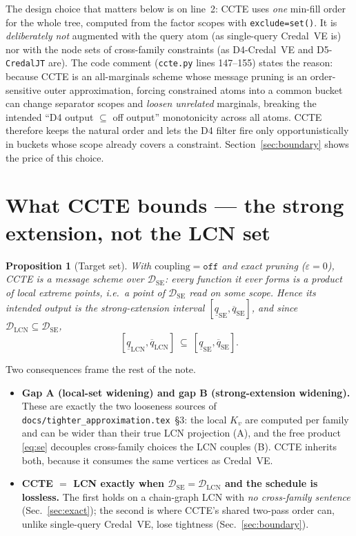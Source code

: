 \documentclass[11pt]{article}
\newtheorem{proposition}{Proposition}
\newcommand{\lo}{\underline}
\newcommand{\hi}{\overline}
\newcommand{\DSE}{\mathcal{D}_{\mathrm{SE}}}
\newcommand{\DLCN}{\mathcal{D}_{\mathrm{LCN}}}
\begin{document}
The design choice that matters below is on line~2: CCTE uses \emph{one} min-fill order for the
whole tree, computed from the factor scopes with \texttt{exclude=set()}. It is
\emph{deliberately not} augmented with the query atom (as single-query Credal~VE is) nor with
the node sets of cross-family constraints (as D4-Credal~VE and D5-\texttt{CredalJT} are). The
code comment (\texttt{ccte.py} lines 147--155) states the reason: because CCTE is an
all-marginals scheme whose message pruning is an order-sensitive outer approximation, forcing
constrained atoms into a common bucket can change separator scopes and \emph{loosen unrelated}
marginals, breaking the intended ``D4 output $\subseteq$ off output'' monotonicity across all
atoms. CCTE therefore keeps the natural order and lets the D4 filter fire only opportunistically
in buckets whose scope already covers a constraint. Section~\ref{sec:boundary} shows the price
of this choice.

\section{What CCTE bounds --- the strong extension, not the LCN set}\label{sec:whatbounds}

\begin{proposition}[Target set]\label{prop:target}
With $\mathrm{coupling}=\texttt{off}$ and exact pruning ($\varepsilon{=}0$), CCTE is a message
scheme over $\DSE$: every function it ever forms is a product of local extreme points, i.e.\ a
point of $\DSE$ read on some scope. Hence its \emph{intended} output is the strong-extension
interval $[\lo q_{\mathrm{SE}},\hi q_{\mathrm{SE}}]$, and since $\DLCN\subseteq\DSE$,
\[
  [\lo q_{\mathrm{LCN}},\hi q_{\mathrm{LCN}}]\ \subseteq\
  [\lo q_{\mathrm{SE}},\hi q_{\mathrm{SE}}].
\]
\end{proposition}

Two consequences frame the rest of the note.
\begin{itemize}
  \item \textbf{Gap A (local-set widening) and gap B (strong-extension widening).} These are
    exactly the two looseness sources of \texttt{docs/tighter\_approximation.tex}~\S3: the local
    $K_v$ are computed per family and can be wider than their true LCN projection (A), and the
    free product \eqref{eq:se} decouples cross-family choices the LCN couples (B). CCTE inherits
    both, because it consumes the same vertices as Credal~VE.
  \item \textbf{CCTE $=$ LCN exactly when $\DSE=\DLCN$ and the schedule is lossless.} The first
    holds on a chain-graph LCN with \emph{no cross-family sentence} (Sec.~\ref{sec:exact}); the
    second is where CCTE's shared two-pass order can, unlike single-query Credal~VE, lose
    tightness (Sec.~\ref{sec:boundary}).
\end{itemize}
\end{document}
